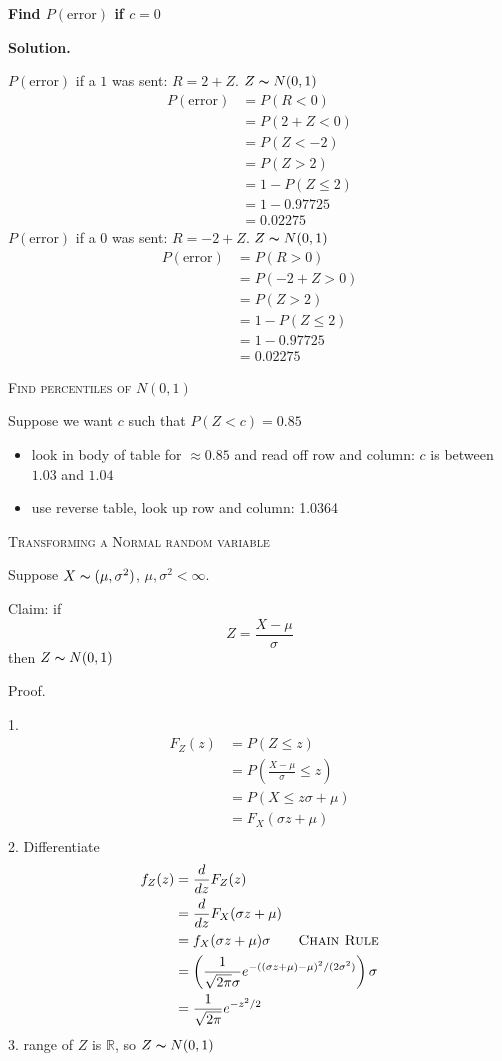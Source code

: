 \textbf{Find $P(\text{error})$ if $ c=0 $}

\textbf{Solution.}

$ P(\text{error}) $ if a $ 1 $ was sent: $ R =2+Z $. $ Z \thicksim N(0,1) $
\begin{align*}
    P(\text{error})&=P(R<0)\\
    &=P(2+Z<0)\\
    &=P(Z<-2)\\
    &=P(Z>2)\\
    &=1-P(Z\le 2)\\
    &=1-0.97725\\
    &=0.02275
\end{align*}
$ P(\text{error}) $ if a $ 0 $ was sent: $ R=-2+Z $. $ Z \thicksim N(0,1) $
\begin{align*}
    P(\text{error})&=P(R>0)\\
    &=P(-2+Z>0)\\
    &=P(Z>2)\\
    &=1-P(Z\le 2)\\
    &=1-0.97725\\
    &=0.02275
\end{align*}

\textsc{Find percentiles of $ N(0,1) $}

Suppose we want $ c $ such that $ P(Z<c)=0.85 $
\begin{itemize}
    \item look in body of table for $ \approx 0.85 $ and read off row and column: $ c $ is between $ 1.03 $ and $ 1.04 $
    \item use reverse table, look up row and column: 1.0364
\end{itemize}

\textsc{Transforming a Normal random variable}

Suppose $ X \thicksim (\mu,\sigma^2) $, $ \mu,\sigma^2<\infty $.

Claim: if
\[ Z=\frac{X-\mu}{\sigma}  \]
then $ Z \thicksim N(0,1) $

Proof.

1.
\begin{align*}
    F_Z(z)&=P(Z\le z)\\
    &=P\left(\frac{X-\mu}{\sigma}\le z\right)\\
    &=P\left(X\le z\sigma + \mu\right)\\
    &=F_X(\sigma z+\mu)\\
\end{align*}
2. Differentiate
\begin{align*}
    f_Z(z)&=\frac{d}{dz}F_Z(z)\\
    &=\frac{d}{dz}F_X(\sigma z+\mu)\\
    &=f_X(\sigma z+\mu)\sigma \qquad \textsc{Chain Rule}\\
    &=\left(\frac{1}{\sqrt{2\pi}\sigma}e^{-((\sigma z+\mu)-\mu)^2/(2\sigma^2)}\right)\sigma\\
    &=\frac{1}{\sqrt{2\pi}}e^{-z^2/2}
\end{align*}
3. range of $ Z $ is $ \mathbb{R} $, so $ Z \thicksim N(0,1) $

